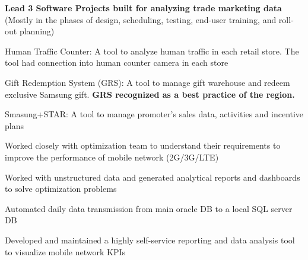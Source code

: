 \documentclass[letterpaper]{deedy-resume} %
\begin{document}
\begin{minipage}[t]{0.66\textwidth}
\sectionspace %


\begin{tightitemize}
\item {\bf Lead 3 Software Projects built for analyzing trade marketing data}\\
(Mostly in the phases of design, scheduling, testing, end-user training, and roll-out planning)
\begin{tightitemize}
\vspace{\topsep} %
\item Human Traffic Counter: A tool to analyze human traffic in each retail store. The tool had connection into human counter camera in each store
\item  Gift Redemption System (GRS): A tool to manage gift warehouse and redeem exclusive Samsung gift. {\bf GRS recognized as a best practice of the region.}
\item Smasung+STAR: A tool to manage promoter's sales data, activities and incentive plans
\end{tightitemize}
\end{tightitemize}

\sectionspace %

\begin{tightitemize}
\item Worked closely with optimization team to understand their requirements to improve the performance of mobile network (2G/3G/LTE)
\item Worked with unstructured data and generated analytical reports and dashboards to solve optimization problems
\item Automated daily data transmission from main oracle DB to a local SQL server DB 
\item Developed and maintained a highly self-service reporting and data analysis tool to visualize mobile network KPIs
\end{tightitemize}
\sectionspace %



\end{minipage} %
\end{document}
